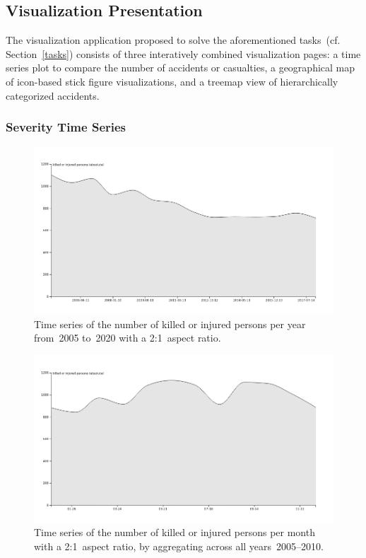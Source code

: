 \subsection{Visualization Presentation}
\label{presentation}
The visualization application proposed to solve the aforementioned tasks~(cf. Section~\ref{tasks}) consists of three interatively combined visualization pages: \Ni a time series plot to compare the number of accidents or casualties, \Nii a geographical map of icon-based stick figure visualizations, and \Niii a treemap view of hierarchically categorized accidents.

\subsubsection{Severity Time Series}
\begin{figure}
    \centering
    \includegraphics[width=0.9\linewidth]{figures/time-series-2-to-1-killed-or-injured-absolute-never-per-year.png}
    \caption{Time series of the number of killed or injured persons per year from~2005 to~2020 with a 2:1~aspect ratio.}
    \label{figure-time-series-killed-injured-per-year}
\end{figure}
\begin{figure}
    \centering
    \includegraphics[width=0.9\linewidth]{figures/time-series-2-to-1-killed-or-injured-absolute-by-year-per-month.png}
    \caption{Time series of the number of killed or injured persons per month with a 2:1~aspect ratio, by aggregating across all years~2005--2010.}
    \label{figure-time-series-killed-injured-by-year-per-month}
\end{figure}
